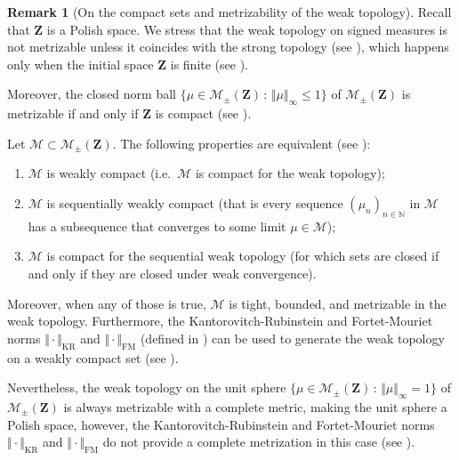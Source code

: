 \documentclass{amsart}
\newcommand{\ie}{i.e.\ }
\theoremstyle{plain}
\theoremstyle{definition}
\newtheorem{remark}[Th]{Remark}
\newcommand{\Space}{\mathbf{Z}}
\newcommand{\cM}{\mathcal{M}}
\newcommand{\SignedMeas}{\mathcal{M}_{\pm}(\Space)}
\newcommand{\TM}[1]{\norm{#1}_\infty}
\newcommand{\mKR}{\text{KR}}
\newcommand{\NmeasKRSymbol}{\Vert\cdot\Vert_{\mKR}}
\newcommand{\mFM}{\text{FM}}
\newcommand{\NmeasFMSymbol}{\Vert\cdot\Vert_{\mFM}}
\newcommand{\N}{\mathbb{N}}
\newcommand{\norm}[1]{\Vert#1\Vert}
\begin{document}
\begin{remark}[On the compact sets and metrizability of the weak topology]
  \label{rem:topo1}
 Recall that  $\Space$ is a Polish space. 
   We stress that the weak topology on signed measures is not metrizable 
unless it coincides with the strong topology (see \cite[Theorem~4.1]{Varadarajan}),
which happens only when the initial space $\Space$ is finite (see
\cite[Proposition~3.1.8]{Bogachev}).

Moreover, the closed norm ball 
	$\{ \mu\in\SignedMeas \, : \, \TM{\mu} \leq 1\}$
	of $\SignedMeas$ is metrizable
	if and only if $\Space$ is compact
	(see \cite[Proposition 3.1.8 and Theorem 3.1.9]{Bogachev}).
	
Let $\cM\subset\SignedMeas$. The following properties are
          equivalent (see \cite[Theorems 2.3.4 and 3.1.9]{Bogachev}):
          \begin{enumerate}[label=(\roman*)]
          \item $\cM$ is weakly compact
          		(\ie $\cM$ is compact for the weak topology);
          \item $\cM$ is sequentially weakly compact (that is every sequence $(\mu_n)_{n\in\N}$ in $\cM$ 
          			has a subsequence that converges to some limit $\mu\in \cM$);
            \item $\cM$ is compact for the sequential weak topology (for
              which sets are closed if and only if they are closed under weak convergence).
            \end{enumerate}
Moreover, when any of those is true, $\cM$ is tight, bounded, and metrizable in the weak topology.
        Furthermore, the Kantorovitch-Rubinstein and Fortet-Mouriet 
		norms $\NmeasKRSymbol$ and $\NmeasFMSymbol$ 
		(defined in )
	can be used to generate the weak topology on a weakly compact set
	(see {\cite[Remark 3.2.5]{Bogachev}}).

Nevertheless, the weak topology on
	the unit sphere $\{ \mu\in\SignedMeas \, : \, \TM{\mu} = 1 \}$
	of $\SignedMeas$ 
	is always metrizable with a complete metric, making the unit sphere a Polish space,
	however,  the Kantorovitch-Rubinstein and Fortet-Mouriet 
		norms $\NmeasKRSymbol$ and $\NmeasFMSymbol$ 
		do not provide a complete metrization in this case
	(see \cite[Theorem 3.2.8]{Bogachev}).
\end{remark}
\end{document}
